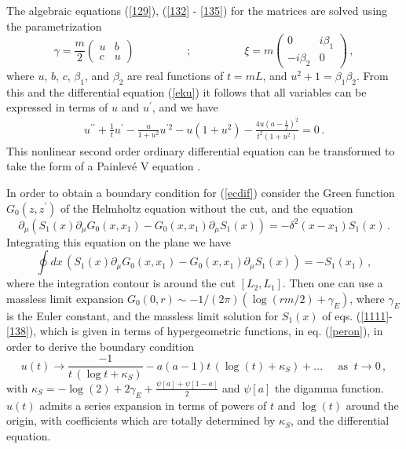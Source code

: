 \documentclass[11pt]{article}
\begin{document}
The algebraic equations (\ref{129}), (\ref{132} - \ref{135}) for the matrices are solved using the
parametrization
\begin{equation}
\gamma =\frac{m}{2}\left(
\begin{array}{ll}
u & b \\
c & u
\end{array}
\right)
\hspace{2cm};\hspace{2cm}\xi
=m\left(
\begin{array}{ll}
0 & i\beta _{1} \\
-i\beta _{2} & 0
\end{array}
\right)\,,
\end{equation}
where $u$, $b$, $c$, $\beta _{1}$, and $\beta _{2}$ are real functions of $t=mL$, and
$
u^{2}+1=\beta _{1}\beta _{2}$. 
From this and the differential equation (\ref{eku}) it follows that all variables can be expressed in terms of $u$ and $u^\prime$, and we have
\begin{eqnarray}
u^{\prime \prime } + \frac{1}{t}u^{\prime}-\frac{u}{1+u^{2}}
u^{\prime 2}-u(1+u^{2})-\frac{4u\left( a -\frac{1}{2}\right) ^{2}}{
t^{2}(1+u^{2})}=0 \label{ecdif}\,.
\end{eqnarray}
This nonlinear second order ordinary differential equation can be transformed to take 
 the form of a 
 Painlev\'e V equation \cite{fermion,ince}. 

In order to obtain a boundary condition for (\ref{ecdif}) consider the Green function $G_0(z,z^\prime)$ of the Helmholtz equation without the cut, and the equation
\begin{equation}
\partial_\mu \left(S_1(x)\partial_\mu G_0(x,x_1)-G_0(x,x_1)\partial_\mu S_1(x)\right)=-\delta^2(x-x_1) S_1(x)\,.
\end{equation} 
Integrating this equation on the plane we have
\begin{equation}
\oint dx\, \left(S_1(x)\partial_\mu G_0(x,x_1)-G_0(x,x_1)\partial_\mu S_1(x)\right)=-S_1(x_1)\,,\label{peron}
\end{equation}
 where the integration contour is around the cut $[L_2,L_1]$. Then one can use a massless limit expansion $G_0(0,r)\sim -1/(2\pi)(\log(r m/2)+\gamma_E)$, where $\gamma_E$ is the Euler constant, and the massless limit solution for $S_1(x)$ of eqs. (\ref{1111}-\ref{138}), which is given in terms of hypergeometric functions, in eq. (\ref{peron}), in order to derive the boundary condition 
\begin{equation}
u(t) \rightarrow  \frac{-1}{t \,(\log t+\kappa_S)}-a(a-1)t\,( \log(t)+\kappa_S)+...\;\;\;\;\;\textrm{as}\;\;t\to 0\,,\label{bbb1}
\end{equation}
with $\kappa_S=-\log(2)+2\gamma_E+\frac{\psi[a]+\psi[1-a]}{2}$ and $\psi[a]$ the digamma function. $u(t)$ admits a series expansion in terms of powers of $t$ and $\log(t)$ around the origin, with coefficients which are totally determined by $\kappa_S$, and the differential equation.
\end{document}
